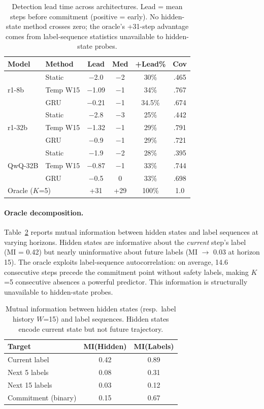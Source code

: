 \documentclass[11pt,a4paper]{article}
\begin{document}
\begin{table}[t]
\centering
\small
\begin{tabular}{llcccc}
\toprule
\textbf{Model} & \textbf{Method} & \textbf{Lead} & \textbf{Med} & \textbf{+Lead\%} & \textbf{Cov} \\
\midrule
\multirow{3}{*}{r1-8b} & Static & $-$2.0 & $-$2 & 30\% & .465 \\
& Temp W15 & $-$1.09 & $-$1 & 34\% & .767 \\
& GRU & $-$0.21 & $-$1 & 34.5\% & .674 \\
\midrule
\multirow{3}{*}{r1-32b} & Static & $-$2.8 & $-$3 & 25\% & .442 \\
& Temp W15 & $-$1.32 & $-$1 & 29\% & .791 \\
& GRU & $-$0.9 & $-$1 & 29\% & .721 \\
\midrule
\multirow{3}{*}{QwQ-32B} & Static & $-$1.9 & $-$2 & 28\% & .395 \\
& Temp W15 & $-$0.87 & $-$1 & 33\% & .744 \\
& GRU & $-$0.5 & 0 & 33\% & .698 \\
\midrule
\multicolumn{2}{l}{Oracle ($K$=5)} & +31 & +29 & 100\% & 1.0 \\
\bottomrule
\end{tabular}
\caption{Detection lead time across architectures.  Lead = mean steps before commitment (positive = early). No hidden-state method crosses zero; the oracle's +31-step advantage comes from label-sequence statistics unavailable to hidden-state probes.}
\label{tab:leadtime}
\end{table}

\paragraph{Oracle decomposition.}
Table~\ref{tab:oracle_mi} reports mutual information between hidden states and label sequences at varying horizons.
Hidden states are informative about the \emph{current} step's label (MI = 0.42) but nearly uninformative about future labels (MI $\to$ 0.03 at horizon 15).
The oracle exploits label-sequence autocorrelation: on average, 14.6 consecutive steps precede the commitment point without safety labels, making $K$=5 consecutive absences a powerful predictor.
This information is structurally unavailable to hidden-state probes.

\begin{table}[t]
\centering
\small
\begin{tabular}{lcc}
\toprule
\textbf{Target} & \textbf{MI(Hidden)} & \textbf{MI(Labels)} \\
\midrule
Current label & 0.42 & 0.89 \\
Next 5 labels & 0.08 & 0.31 \\
Next 15 labels & 0.03 & 0.12 \\
Commitment (binary) & 0.15 & 0.67 \\
\bottomrule
\end{tabular}
\caption{Mutual information between hidden states (resp.\ label history $W$=15) and label sequences. Hidden states encode current state but not future trajectory.}
\label{tab:oracle_mi}
\end{table}
\end{document}
